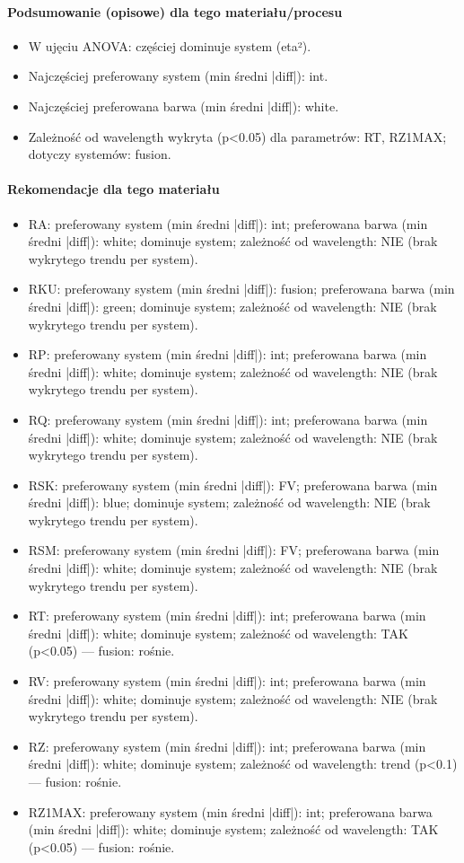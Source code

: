 \documentclass[
  10pt,
]{article}
\begin{document}
\paragraph{Podsumowanie (opisowe) dla tego materiału/procesu}
\begin{itemize}
\item W ujęciu ANOVA: częściej dominuje system (eta²).
\item Najczęściej preferowany system (min średni |diff|): int.
\item Najczęściej preferowana barwa (min średni |diff|): white.
\item Zależność od wavelength wykryta (p<0.05) dla parametrów: RT, RZ1MAX; dotyczy systemów: fusion.
\end{itemize}
\paragraph{Rekomendacje dla tego materiału}
\begin{itemize}
\item RA: preferowany system (min średni |diff|): int; preferowana barwa (min średni |diff|): white; dominuje system; zależność od wavelength: NIE (brak wykrytego trendu per system).
\item RKU: preferowany system (min średni |diff|): fusion; preferowana barwa (min średni |diff|): green; dominuje system; zależność od wavelength: NIE (brak wykrytego trendu per system).
\item RP: preferowany system (min średni |diff|): int; preferowana barwa (min średni |diff|): white; dominuje system; zależność od wavelength: NIE (brak wykrytego trendu per system).
\item RQ: preferowany system (min średni |diff|): int; preferowana barwa (min średni |diff|): white; dominuje system; zależność od wavelength: NIE (brak wykrytego trendu per system).
\item RSK: preferowany system (min średni |diff|): FV; preferowana barwa (min średni |diff|): blue; dominuje system; zależność od wavelength: NIE (brak wykrytego trendu per system).
\item RSM: preferowany system (min średni |diff|): FV; preferowana barwa (min średni |diff|): white; dominuje system; zależność od wavelength: NIE (brak wykrytego trendu per system).
\item RT: preferowany system (min średni |diff|): int; preferowana barwa (min średni |diff|): white; dominuje system; zależność od wavelength: TAK (p<0.05) — fusion: rośnie.
\item RV: preferowany system (min średni |diff|): int; preferowana barwa (min średni |diff|): white; dominuje system; zależność od wavelength: NIE (brak wykrytego trendu per system).
\item RZ: preferowany system (min średni |diff|): int; preferowana barwa (min średni |diff|): white; dominuje system; zależność od wavelength: trend (p<0.1) — fusion: rośnie.
\item RZ1MAX: preferowany system (min średni |diff|): int; preferowana barwa (min średni |diff|): white; dominuje system; zależność od wavelength: TAK (p<0.05) — fusion: rośnie.
\end{itemize}
\end{document}
